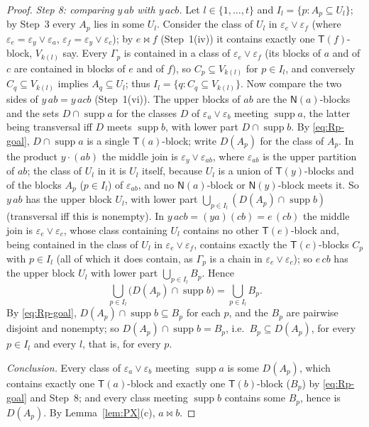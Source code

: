 \documentclass[11pt]{amsart}
\theoremstyle{definition}
\newcommand{\supp}{\operatorname{supp}}
\newcommand{\T}{\mathsf{T}}
\newcommand{\N}{\mathsf{N}}
\newcommand{\mt}{\bowtie}      %
\begin{document}
\begin{proof}
\emph{Step 8: comparing $y\,ab$ with $y\,acb$.} Let $l\in\{1,\dots,t\}$ and $I_l=\{p:A_p\subseteq U_l\}$; by Step~3 every $A_p$ lies in some $U_l$. Consider the class of $U_l$ in $\varepsilon_e\vee\varepsilon_f$ (where $\varepsilon_e=\varepsilon_y\vee\varepsilon_a$, $\varepsilon_f=\varepsilon_y\vee\varepsilon_c$); by $e\mt f$ (Step~1(iv)) it contains exactly one $\T(f)$-block, $V_{k(l)}$ say. Every $\Gamma_p$ is contained in a class of $\varepsilon_e\vee\varepsilon_f$ (its blocks of $a$ and of $c$ are contained in blocks of $e$ and of $f$), so $C_p\subseteq V_{k(l)}$ for $p\in I_l$, and conversely $C_q\subseteq V_{k(l)}$ implies $A_q\subseteq U_l$; thus $I_l=\{q:C_q\subseteq V_{k(l)}\}$. Now compare the two sides of $y\,ab=y\,acb$ (Step~1(vi)). The upper blocks of $ab$ are the $\N(a)$-blocks and the sets $D\cap\supp a$ for the classes $D$ of $\varepsilon_a\vee\varepsilon_b$ meeting $\supp a$, the latter being transversal iff $D$ meets $\supp b$, with lower part $D\cap\supp b$. By \eqref{eq:Rp-goal}, $D\cap\supp a$ is a single $\T(a)$-block; write $D(A_p)$ for the class of $A_p$. In the product $y\cdot(ab)$ the middle join is $\varepsilon_y\vee\varepsilon_{ab}$, where $\varepsilon_{ab}$ is the upper partition of $ab$; the class of $U_l$ in it is $U_l$ itself, because $U_l$ is a union of $\T(y)$-blocks and of the blocks $A_p$ ($p\in I_l$) of $\varepsilon_{ab}$, and no $\N(a)$-block or $\N(y)$-block meets it. So $y\,ab$ has the upper block $U_l$, with lower part $\bigcup_{p\in I_l}(D(A_p)\cap\supp b)$ (transversal iff this is nonempty). In $y\,acb=(ya)(cb)=e\,(cb)$ the middle join is $\varepsilon_e\vee\varepsilon_c$, whose class containing $U_l$ contains no other $\T(e)$-block and, being contained in the class of $U_l$ in $\varepsilon_e\vee\varepsilon_f$, contains exactly the $\T(c)$-blocks $C_p$ with $p\in I_l$ (all of which it does contain, as $\Gamma_p$ is a chain in $\varepsilon_e\vee\varepsilon_c$); so $e\,cb$ has the upper block $U_l$ with lower part $\bigcup_{p\in I_l}B_p$. Hence
\[
\bigcup_{p\in I_l}\bigl(D(A_p)\cap\supp b\bigr)=\bigcup_{p\in I_l}B_p .
\]
By \eqref{eq:Rp-goal}, $D(A_p)\cap\supp b\subseteq B_p$ for each $p$, and the $B_p$ are pairwise disjoint and nonempty; so $D(A_p)\cap\supp b=B_p$, i.e.\ $B_p\subseteq D(A_p)$, for every $p\in I_l$ and every $l$, that is, for every $p$.

\emph{Conclusion.} Every class of $\varepsilon_a\vee\varepsilon_b$ meeting $\supp a$ is some $D(A_p)$, which contains exactly one $\T(a)$-block and exactly one $\T(b)$-block ($B_p$) by \eqref{eq:Rp-goal} and Step~8; and every class meeting $\supp b$ contains some $B_p$, hence is $D(A_p)$. By Lemma~\ref{lem:PX}(c), $a\mt b$.
\end{proof}
\end{document}
